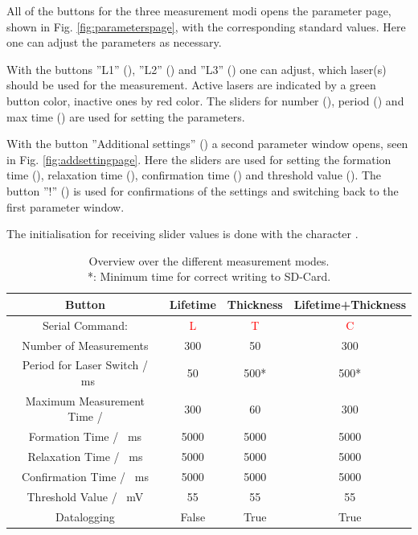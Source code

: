 	All of the buttons for the three measurement modi opens the parameter page, shown in Fig. \ref{fig:parameterspage}, with the corresponding standard values. Here one can adjust the parameters as necessary.
	
	With the buttons ''L1'' (), ''L2'' () and ''L3'' () one can adjust, which laser(s) should be used for the measurement. Active lasers are indicated by a green button color, inactive ones by red color.
	The sliders for number (), period () and max time () are used for setting the parameters.
	
	With the button ''Additional settings'' () a second parameter window opens, seen in Fig. \ref{fig:addsettingpage}.
	Here the sliders are used for setting the formation time (), relaxation time (), confirmation time () and threshold value (). 
	The button ''!'' () is used for confirmations of the settings and switching back to the first parameter window. 
	
	The initialisation for receiving slider values is done with the character \Nextion{\&}.
	
	\begin{table}[h]
		\centering
		\label{tab:OverviewMeasurementModes}
		\caption{Overview over the different measurement modes. \\ *: Minimum time for correct writing to SD-Card.}
		\begin{tabular}{|c|c|c|c|}
			\hline 
			Button & Lifetime & Thickness & Lifetime+Thickness \\ 
			\hline 
			Serial Command: & \textcolor{red}{L} & \textcolor{red}{T} & \textcolor{red}{C} \\ 
			\hline 
			Number of Measurements & 300 & 50 & 300 \\ 
			\hline 
			Period for Laser Switch / \SI{}{\milli\second} & 50 & 500* & 500* \\ 
			\hline 
			Maximum Measurement Time / \SI{}{\min} & 300 & 60 & 300 \\ 
			\hline 
			Formation Time / \SI{}{\milli\second} & 5000 & 5000 & 5000 \\ 
			\hline 
			Relaxation Time / \SI{}{\milli\second} & 5000 & 5000 & 5000 \\ 
			\hline 
			Confirmation Time / \SI{}{\milli\second} & 5000 & 5000 & 5000 \\ 
			\hline 
			Threshold Value / \SI{}{\milli\volt} & 55 & 55 & 55 \\ 
			\hline 
			Datalogging & False & True & True \\ 
			\hline 
		\end{tabular} 
	\end{table}
	
